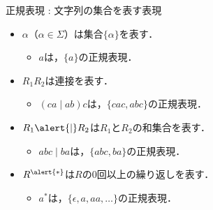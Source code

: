 \documentclass[dvipdfmx,beamer]{standalone}
\begin{document}
\begin{frame}{正規表現} : 文字列の集合を表す表現\\
	\begin{itemize}
    \item $\alpha$（$\alpha \in \Sigma$）は集合$\{\alpha\}$を表す．
			\begin{itemize}
        \item $a$は，$\{a\}$の正規表現．
			\end{itemize}
		\item $R_1R_2$は連接を表す．
			\begin{itemize}
				\item $(ca\mid ab)c$は，$\{cac, abc\}$の正規表現．
			\end{itemize}
    \item $R_1\alert{\mid}R_2$は$R_1$と$R_2$の和集合を表す．
			\begin{itemize}
				\item $abc\mid ba$は，$\{abc, ba\}$の正規表現．
			\end{itemize}
    \item $R^{\alert{*}}$は$R$の$0$回以上の繰り返しを表す．
			\begin{itemize}
				\item $a^*$は，$\{\epsilon, a, aa, \ldots\}$の正規表現．
			\end{itemize}
	\end{itemize}
\end{frame}
\end{document}
